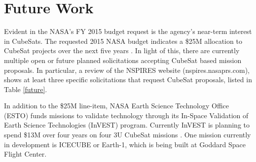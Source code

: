 \documentclass[11pt]{article}
\begin{document}
\begin{table}[h]
\centering

\caption{Processor Specifications}
\label{procspecs}
\end{table}

\section{Future Work}
Evident in the NASA's FY 2015 budget request is the agency's near-term interest in CubeSats. The requested 2015 NASA budget indicates a \$25M allocation to CubeSat projects over the next five years \cite{budget}. In light of this, there are currently multiple open or future planned solicitations accepting CubeSat based mission proposals. In particular, a review of the NSPIRES website (nspires.nasaprs.com), shows at least three specific solicitations that request CubeSat proposals, listed in Table \ref{future}. 

In addition to the \$25M line-item, NASA Earth Science Technology Office (ESTO) funds missions to validate technology through its In-Space Validation of Earth Science Technologies (InVEST) program. Currently InVEST is planning to spend \$13M over four years on four 3U CubeSat missions \cite{klumpar}. One mission currently in development is ICECUBE or Earth-1, which is being built at Goddard Space Flight Center. 
\end{document}
